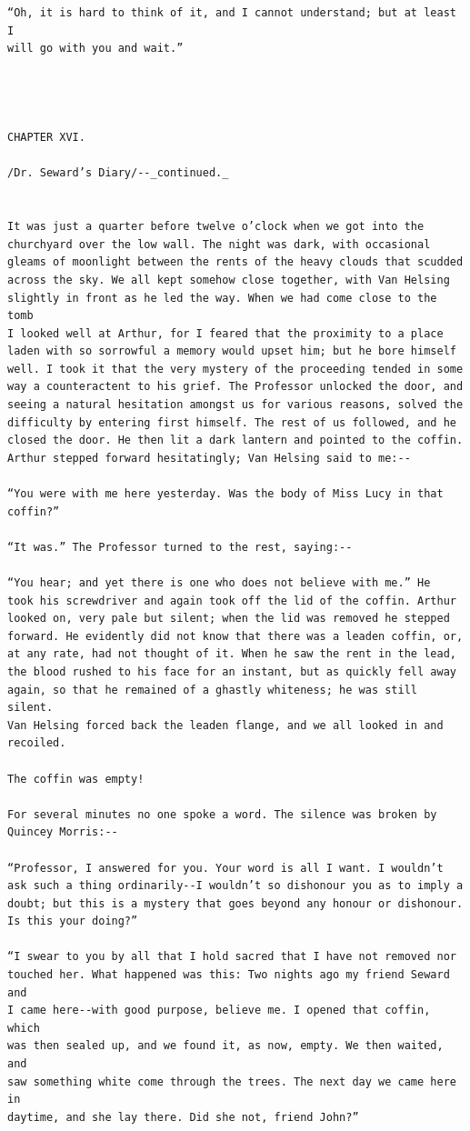 \documentclass{article}
\begin{document}
\begin{verbatim}
“Oh, it is hard to think of it, and I cannot understand; but at least I
will go with you and wait.”




CHAPTER XVI.

/Dr. Seward’s Diary/--_continued._


It was just a quarter before twelve o’clock when we got into the
churchyard over the low wall. The night was dark, with occasional
gleams of moonlight between the rents of the heavy clouds that scudded
across the sky. We all kept somehow close together, with Van Helsing
slightly in front as he led the way. When we had come close to the tomb
I looked well at Arthur, for I feared that the proximity to a place
laden with so sorrowful a memory would upset him; but he bore himself
well. I took it that the very mystery of the proceeding tended in some
way a counteractent to his grief. The Professor unlocked the door, and
seeing a natural hesitation amongst us for various reasons, solved the
difficulty by entering first himself. The rest of us followed, and he
closed the door. He then lit a dark lantern and pointed to the coffin.
Arthur stepped forward hesitatingly; Van Helsing said to me:--

“You were with me here yesterday. Was the body of Miss Lucy in that
coffin?”

“It was.” The Professor turned to the rest, saying:--

“You hear; and yet there is one who does not believe with me.” He
took his screwdriver and again took off the lid of the coffin. Arthur
looked on, very pale but silent; when the lid was removed he stepped
forward. He evidently did not know that there was a leaden coffin, or,
at any rate, had not thought of it. When he saw the rent in the lead,
the blood rushed to his face for an instant, but as quickly fell away
again, so that he remained of a ghastly whiteness; he was still silent.
Van Helsing forced back the leaden flange, and we all looked in and
recoiled.

The coffin was empty!

For several minutes no one spoke a word. The silence was broken by
Quincey Morris:--

“Professor, I answered for you. Your word is all I want. I wouldn’t
ask such a thing ordinarily--I wouldn’t so dishonour you as to imply a
doubt; but this is a mystery that goes beyond any honour or dishonour.
Is this your doing?”

“I swear to you by all that I hold sacred that I have not removed nor
touched her. What happened was this: Two nights ago my friend Seward and
I came here--with good purpose, believe me. I opened that coffin, which
was then sealed up, and we found it, as now, empty. We then waited, and
saw something white come through the trees. The next day we came here in
daytime, and she lay there. Did she not, friend John?”


\end{verbatim}
\end{document}
